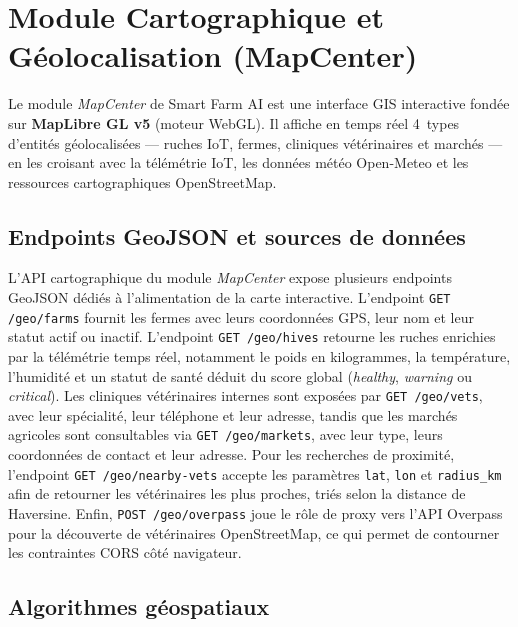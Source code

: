 \section{Module Cartographique et Géolocalisation (MapCenter)}
\label{sec:mapcenter}

Le module \textit{MapCenter} de Smart Farm AI est une interface GIS interactive
fondée sur \textbf{MapLibre GL v5} (moteur WebGL). Il affiche en temps réel
4~types d'entités géolocalisées — ruches IoT, fermes, cliniques vétérinaires et
marchés — en les croisant avec la télémétrie IoT, les données météo Open-Meteo
et les ressources cartographiques OpenStreetMap.

\subsection{Endpoints GeoJSON et sources de données}

L'API cartographique du module \textit{MapCenter} expose plusieurs endpoints
GeoJSON dédiés à l'alimentation de la carte interactive. L'endpoint
\texttt{GET /geo/farms} fournit les fermes avec leurs coordonnées GPS, leur nom
et leur statut actif ou inactif. L'endpoint \texttt{GET /geo/hives} retourne les
ruches enrichies par la télémétrie temps réel, notamment le poids en kilogrammes,
la température, l'humidité et un statut de santé déduit du score global
(\textit{healthy}, \textit{warning} ou \textit{critical}). Les cliniques
vétérinaires internes sont exposées par \texttt{GET /geo/vets}, avec leur
spécialité, leur téléphone et leur adresse, tandis que les marchés agricoles sont
consultables via \texttt{GET /geo/markets}, avec leur type, leurs coordonnées de
contact et leur adresse. Pour les recherches de proximité, l'endpoint
\texttt{GET /geo/nearby-vets} accepte les paramètres
\texttt{lat}, \texttt{lon} et \texttt{radius\_km} afin de retourner les
vétérinaires les plus proches, triés selon la distance de Haversine. Enfin,
\texttt{POST /geo/overpass} joue le rôle de proxy vers l'API Overpass pour la
découverte de vétérinaires OpenStreetMap, ce qui permet de contourner les
contraintes CORS côté navigateur.

\subsection{Algorithmes géospatiaux}

